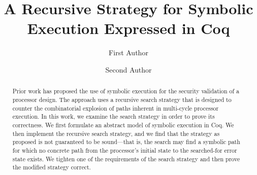 \documentclass[runningheads]{llncs}
\begin{document}
\title{A Recursive Strategy for Symbolic Execution Expressed in Coq}
\author{First Author \and
Second Author }



\maketitle

\begin{abstract}
Prior work has proposed the use of symbolic execution for the security
validation of a processor design. The approach uses a recursive search strategy
that is designed to counter the combinatorial explosion of paths inherent in multi-cycle
processor execution. In this work, we examine the search strategy in order to
prove its correctness. We first formulate an abstract model of symbolic
execution in Coq. We then implement the recursive search strategy, and we find that the
strategy as proposed is not guaranteed to be sound---that is, the
search may find a symbolic path for which no concrete path from the processor's initial state
to the searched-for error state exists. We tighten one of the requirements of the
search strategy and then prove the modified strategy correct. 
\end{abstract}






%




%




\end{document}
